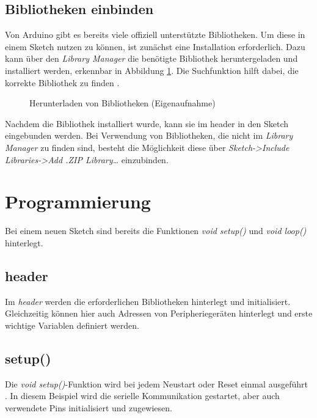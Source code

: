 \subsection{Bibliotheken einbinden}

Von Arduino gibt es bereits viele offiziell unterstützte Bibliotheken. Um diese in einem Sketch nutzen zu können, ist zunächst eine Installation erforderlich.
Dazu kann über den \textit{Library Manager} die benötigte Bibliothek heruntergeladen und installiert werden, erkennbar in Abbildung \ref{Librarymanager}. Die Suchfunktion hilft dabei, die korrekte Bibliothek zu finden \cite{ArdIDE.2024c}.

\begin{figure}[H]
	\begin{center}
		\caption{Herunterladen von Bibliotheken (Eigenaufnahme)} \label{Librarymanager}
	\end{center}
\end{figure}

Nachdem die Bibliothek installiert wurde, kann sie im header in den Sketch eingebunden werden.
Bei Verwendung von Bibliotheken, die nicht im \textit{Library Manager} zu finden sind, besteht die Möglichkeit diese über \textit{Sketch->Include Libraries->Add .ZIP Library…} einzubinden.

\section{Programmierung}

Bei einem neuen Sketch sind bereits die Funktionen \textit{void setup()} und \textit{void loop()} hinterlegt.

\subsection{header}

Im \textit{header} werden die erforderlichen Bibliotheken hinterlegt und initialisiert. Gleichzeitig können hier auch Adressen von Peripheriegeräten hinterlegt und erste wichtige Variablen definiert werden.

\subsection{setup()}

Die \textit{void setup()}-Funktion wird bei jedem Neustart oder Reset einmal ausgeführt \cite{ArdIDE.2024d}.
In diesem Beispiel wird die serielle Kommunikation gestartet, aber auch verwendete Pins initialisiert und zugewiesen.

